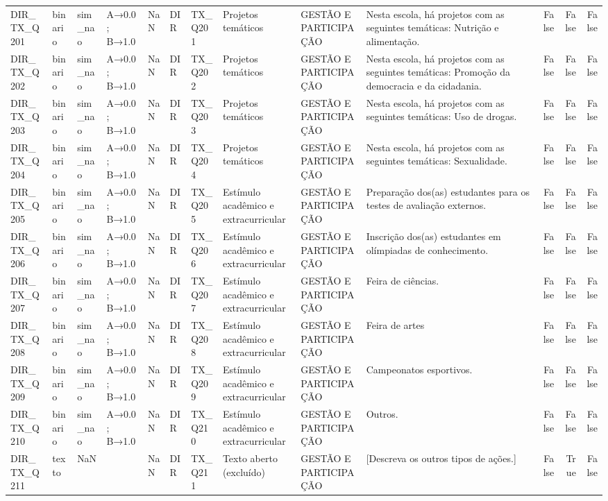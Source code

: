 \begin{tabular}{llllllllllrrr}
DIR\_TX\_Q201 & binario & sim\_nao & A→0.0; B→1.0 & NaN & DIR & TX\_Q201 & Projetos temáticos & GESTÃO E PARTICIPAÇÃO & Nesta escola, há projetos com as seguintes temáticas: Nutrição e alimentação. & False & False & False \\
DIR\_TX\_Q202 & binario & sim\_nao & A→0.0; B→1.0 & NaN & DIR & TX\_Q202 & Projetos temáticos & GESTÃO E PARTICIPAÇÃO & Nesta escola, há projetos com as seguintes temáticas: Promoção da democracia e da cidadania. & False & False & False \\
DIR\_TX\_Q203 & binario & sim\_nao & A→0.0; B→1.0 & NaN & DIR & TX\_Q203 & Projetos temáticos & GESTÃO E PARTICIPAÇÃO & Nesta escola, há projetos com as seguintes temáticas: Uso de drogas. & False & False & False \\
DIR\_TX\_Q204 & binario & sim\_nao & A→0.0; B→1.0 & NaN & DIR & TX\_Q204 & Projetos temáticos & GESTÃO E PARTICIPAÇÃO & Nesta escola, há projetos com as seguintes temáticas: Sexualidade. & False & False & False \\
DIR\_TX\_Q205 & binario & sim\_nao & A→0.0; B→1.0 & NaN & DIR & TX\_Q205 & Estímulo acadêmico e extracurricular & GESTÃO E PARTICIPAÇÃO & Preparação dos(as) estudantes para os testes de avaliação externos. & False & False & False \\
DIR\_TX\_Q206 & binario & sim\_nao & A→0.0; B→1.0 & NaN & DIR & TX\_Q206 & Estímulo acadêmico e extracurricular & GESTÃO E PARTICIPAÇÃO & Inscrição dos(as) estudantes em olímpiadas de conhecimento. & False & False & False \\
DIR\_TX\_Q207 & binario & sim\_nao & A→0.0; B→1.0 & NaN & DIR & TX\_Q207 & Estímulo acadêmico e extracurricular & GESTÃO E PARTICIPAÇÃO & Feira de ciências. & False & False & False \\
DIR\_TX\_Q208 & binario & sim\_nao & A→0.0; B→1.0 & NaN & DIR & TX\_Q208 & Estímulo acadêmico e extracurricular & GESTÃO E PARTICIPAÇÃO & Feira de artes & False & False & False \\
DIR\_TX\_Q209 & binario & sim\_nao & A→0.0; B→1.0 & NaN & DIR & TX\_Q209 & Estímulo acadêmico e extracurricular & GESTÃO E PARTICIPAÇÃO & Campeonatos esportivos. & False & False & False \\
DIR\_TX\_Q210 & binario & sim\_nao & A→0.0; B→1.0 & NaN & DIR & TX\_Q210 & Estímulo acadêmico e extracurricular & GESTÃO E PARTICIPAÇÃO & Outros. & False & False & False \\
DIR\_TX\_Q211 & texto & NaN &  & NaN & DIR & TX\_Q211 & Texto aberto (excluído) & GESTÃO E PARTICIPAÇÃO & [Descreva os outros tipos de ações.] & False & True & False \\

\end{tabular}
